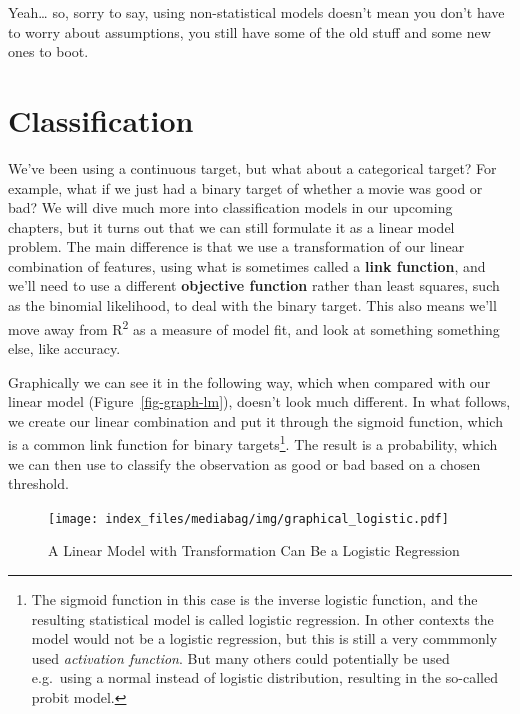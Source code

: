 \documentclass[
  letterpaper,
]{krantz}
\begin{document}
Yeah\ldots{} so, sorry to say, using non-statistical models doesn't mean
you don't have to worry about assumptions, you still have some of the
old stuff and some new ones to boot.

\section{Classification}\label{sec-lm-classification}

We've been using a continuous target, but what about a categorical
target? For example, what if we just had a binary target of whether a
movie was good or bad? We will dive much more into classification models
in our upcoming chapters, but it turns out that we can still formulate
it as a linear model problem. The main difference is that we use a
transformation of our linear combination of features, using what is
sometimes called a \textbf{link function}, and we'll need to use a
different \textbf{objective function} rather than least squares, such as
the binomial likelihood, to deal with the binary target. This also means
we'll move away from R\textsuperscript{2} as a measure of model fit, and
look at something something else, like accuracy.

Graphically we can see it in the following way, which when compared with
our linear model (Figure~\ref{fig-graph-lm}), doesn't look much
different. In what follows, we create our linear combination and put it
through the sigmoid function, which is a common link function for binary
targets\footnote{The sigmoid function in this case is the inverse
  logistic function, and the resulting statistical model is called
  logistic regression. In other contexts the model would not be a
  logistic regression, but this is still a very commmonly used
  \emph{activation function}. But many others could potentially be used
  e.g.~using a normal instead of logistic distribution, resulting in the
  so-called probit model.}. The result is a probability, which we can
then use to classify the observation as good or bad based on a chosen
threshold.

\begin{figure}

{\centering \texttt{[image: index\_files/mediabag/img/graphical\_logistic.pdf]}

}

\caption{\label{fig-graph-logistic}A Linear Model with Transformation
Can Be a Logistic Regression}

\end{figure}
\end{document}
